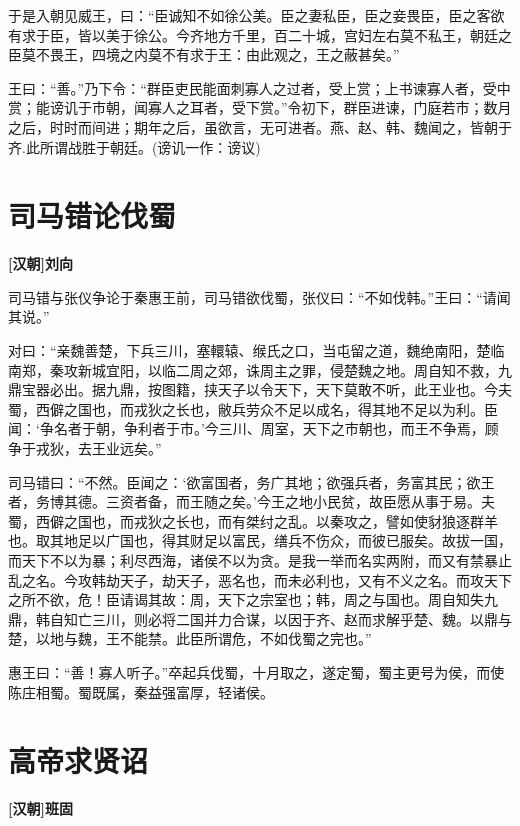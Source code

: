\documentclass[UTF8,titlepage,oneside]{ctexbook}
\begin{document}
于是入朝见威王，曰：“臣诚知不如徐公美。臣之妻私臣，臣之妾畏臣，臣之客欲有求于臣，皆以美于徐公。今齐地方千里，百二十城，宫妇左右莫不私王，朝廷之臣莫不畏王，四境之内莫不有求于王：由此观之，王之蔽甚矣。”


王曰：“善。”乃下令：“群臣吏民能面刺寡人之过者，受上赏；上书谏寡人者，受中赏；能谤讥于市朝，闻寡人之耳者，受下赏。”令初下，群臣进谏，门庭若市；数月之后，时时而间进；期年之后，虽欲言，无可进者。燕、赵、韩、魏闻之，皆朝于齐.此所谓战胜于朝廷。(谤讥一作：谤议)



\chapter*{司马错论伐蜀}
\begin{center}
	\textbf{[汉朝]刘向}
\end{center}


司马错与张仪争论于秦惠王前，司马错欲伐蜀，张仪曰：“不如伐韩。”王曰：“请闻其说。”


对曰：“亲魏善楚，下兵三川，塞轘辕、缑氏之口，当屯留之道，魏绝南阳，楚临南郑，秦攻新城宜阳，以临二周之郊，诛周主之罪，侵楚魏之地。周自知不救，九鼎宝器必出。据九鼎，按图籍，挟天子以令天下，天下莫敢不听，此王业也。今夫蜀，西僻之国也，而戎狄之长也，敝兵劳众不足以成名，得其地不足以为利。臣闻：‘争名者于朝，争利者于市。’今三川、周室，天下之市朝也，而王不争焉，顾争于戎狄，去王业远矣。”


司马错曰：“不然。臣闻之：‘欲富国者，务广其地；欲强兵者，务富其民；欲王者，务博其德。三资者备，而王随之矣。’今王之地小民贫，故臣愿从事于易。夫蜀，西僻之国也，而戎狄之长也，而有桀纣之乱。以秦攻之，譬如使豺狼逐群羊也。取其地足以广国也，得其财足以富民，缮兵不伤众，而彼已服矣。故拔一国，而天下不以为暴；利尽西海，诸侯不以为贪。是我一举而名实两附，而又有禁暴止乱之名。今攻韩劫天子，劫天子，恶名也，而未必利也，又有不义之名。而攻天下之所不欲，危！臣请谒其故：周，天下之宗室也；韩，周之与国也。周自知失九鼎，韩自知亡三川，则必将二国并力合谋，以因于齐、赵而求解乎楚、魏。以鼎与楚，以地与魏，王不能禁。此臣所谓危，不如伐蜀之完也。”


惠王曰：“善！寡人听子。”卒起兵伐蜀，十月取之，遂定蜀，蜀主更号为侯，而使陈庄相蜀。蜀既属，秦益强富厚，轻诸侯。



\chapter*{高帝求贤诏}
\begin{center}
	\textbf{[汉朝]班固}
\end{center}
\end{document}
